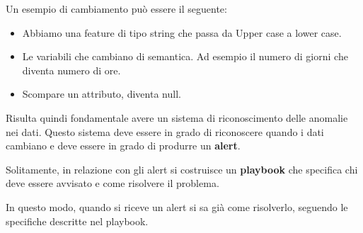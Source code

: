 Un esempio di cambiamento può essere il seguente:
\begin{itemize}
    \item Abbiamo una feature di tipo string che passa da Upper case a lower case.
    \item Le variabili che cambiano di semantica. Ad esempio il numero di giorni
          che diventa numero di ore.
    \item Scompare un attributo, diventa null.
\end{itemize}
Risulta quindi fondamentale avere un sistema di riconoscimento delle anomalie
nei dati. Questo sistema deve essere in grado di riconoscere quando i dati cambiano
e deve essere in grado di produrre un \textbf{alert}. 

Solitamente, in relazione con gli alert si costruisce un \textbf{playbook} che
specifica chi deve essere avvisato e come risolvere il problema.

In questo modo, quando si riceve un alert si sa già come risolverlo, seguendo 
le specifiche descritte nel playbook.